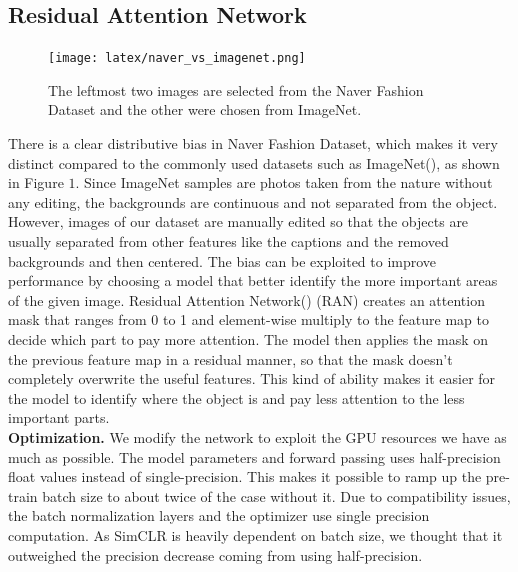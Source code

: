 \documentclass[10pt,twocolumn,letterpaper]{article}
\begin{document}
\subsection{Residual Attention Network}
\begin{figure}
\centering
\texttt{[image: latex/naver\_vs\_imagenet.png]}
\label{fig:datasetcomparison}
\caption{The leftmost two images are selected from the Naver Fashion Dataset and the other were chosen from ImageNet.}
\end{figure}

There is a clear distributive bias in Naver Fashion Dataset, which makes it very distinct compared to the commonly used datasets such as ImageNet(\cite{ILSVRC15}), as shown in Figure $1$. Since ImageNet samples are photos taken from the nature without any editing, the backgrounds are continuous and not separated from the object. However, images of our dataset are manually edited so that the objects are usually separated from other features like the captions and the removed backgrounds and then centered. The bias can be exploited to improve performance by choosing a model that better identify the more important areas of the given image. Residual Attention Network(\cite{RAN}) (RAN) creates an attention mask that ranges from 0 to 1 and element-wise multiply to the feature map to decide which part to pay more attention. The model then applies the mask on the previous feature map in a residual manner, so that the mask doesn't completely overwrite the useful features. This kind of ability makes it easier for the model to identify where the object is and pay less attention to the less important parts.\\

\textbf{Optimization.} We modify the network to exploit the GPU resources we have as much as possible. The model parameters and forward passing uses half-precision float values instead of single-precision. This makes it possible to ramp up the pre-train batch size to about twice of the case without it. Due to compatibility issues, the batch normalization layers and the optimizer use single precision computation. As SimCLR is heavily dependent on batch size\cite{CKNH20}, we thought that it outweighed the precision decrease coming from using half-precision.

\end{document}
